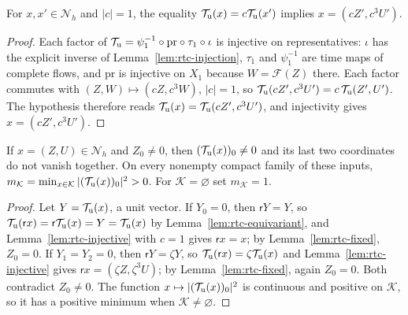 \begin{lemma}\label{lem:rtc-injective}
For $x,x'\in\mathcal N_h$ and $|c|=1$, the equality
$\mathcal T_{\rm u}(x)=c\mathcal T_{\rm u}(x')$ implies
$x=(cZ',c^3U')$.
\end{lemma}
\begin{proof}
Each factor of $\mathcal T_{\rm u}=\psi_1^{-1}\circ\mathrm{pr}\circ\tau_1\circ\iota$ is injective on representatives: $\iota$ has the
explicit inverse of Lemma~\ref{lem:rtc-injection}, $\tau_1$ and $\psi_1^{-1}$ are time maps of complete flows, and $\mathrm{pr}$ is
injective on $X_1$ because $W=\mathcal F(Z)$ there. Each factor commutes with $(Z,W)\mapsto(cZ,c^3W)$, $|c|=1$, so
$\mathcal T_{\rm u}(cZ',c^3U')=c\,\mathcal T_{\rm u}(Z',U')$. The hypothesis therefore reads
$\mathcal T_{\rm u}(x)=\mathcal T_{\rm u}(cZ',c^3U')$, and injectivity gives $x=(cZ',c^3U')$.
\end{proof}


\begin{proposition}\label{prop:rtc-avoid}
If $x=(Z,U)\in\mathcal N_h$ and $Z_0\ne0$, then
$(\mathcal T_{\rm u}(x))_0\ne0$ and its last two coordinates do not vanish together.
On every nonempty compact family of these inputs,
$m_{\mathcal K}=\min_{x\in\mathcal K}|(\mathcal T_{\rm u}(x))_0|^2>0$. For $\mathcal K=\varnothing$ set $m_{\mathcal K}=1$.
\end{proposition}
\begin{proof}
Let $Y=\mathcal T_{\rm u}(x)$, a unit vector. If $Y_0=0$, then $\mathsf r Y=Y$, so
$\mathcal T_{\rm u}(\mathsf r x)=\mathsf r\mathcal T_{\rm u}(x)=Y=\mathcal T_{\rm u}(x)$ by Lemma~\ref{lem:rtc-equivariant}, and
Lemma~\ref{lem:rtc-injective} with $c=1$ gives $\mathsf r x=x$; by Lemma~\ref{lem:rtc-fixed}, $Z_0=0$. If $Y_1=Y_2=0$, then $\mathsf r Y=\zeta Y$, so
$\mathcal T_{\rm u}(\mathsf r x)=\zeta\mathcal T_{\rm u}(x)$ and Lemma~\ref{lem:rtc-injective} gives $\mathsf r x=(\zeta Z,\zeta^3U)$; by
Lemma~\ref{lem:rtc-fixed}, again $Z_0=0$. Both contradict $Z_0\ne0$. The function $x\mapsto|(\mathcal T_{\rm u}(x))_0|^2$ is continuous
and positive on $\mathcal K$, so it has a positive minimum when $\mathcal K\ne\varnothing$.
\end{proof}


